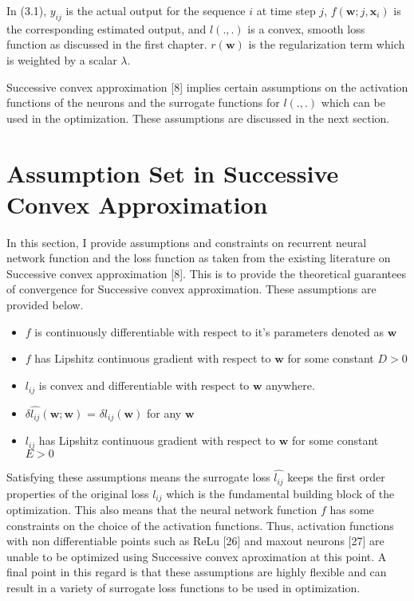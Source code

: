 In (3.1), $y_{ij}$ is the actual output for the sequence $i$ at time step $j$, 
$f(\textbf{w};j,\textbf{x}_i)$ is the corresponding estimated output, and $l(.,.)$ is a convex, smooth loss function as discussed in the first chapter. $r(\textbf{w})$ is the regularization term which is weighted by a scalar $\lambda$.

Successive convex approximation [8] implies certain assumptions on the activation functions of the neurons and the surrogate functions for $l(.,.)$ which can be used in the optimization. These assumptions are discussed in the next section.
\newpage

\section {Assumption Set in Successive Convex Approximation}

In this section, I provide assumptions and constraints on recurrent neural network function and the loss function as taken from the existing literature on Successive convex approximation [8]. This is to provide the theoretical guarantees of convergence for Successive convex approximation. These assumptions are provided below.   
 
\begin{itemize}
	\item $f$ is continuously differentiable with respect to it's parameters denoted as $\textbf{w}$
	\item $f$ has Lipshitz continuous gradient with respect to $\textbf{w}$ for some constant $D>0$
	\item $\hat{l_{ij}}$ is convex and differentiable with respect to $\textbf{w}$ anywhere. 
	\item $\delta \hat{l_{ij}}(\textbf{w};\textbf{w})$ = $\delta l_{ij}(\textbf{w})$ for any $\textbf{w}$
	\item $\hat{l_{ij}}$ has Lipshitz continuous gradient with respect to $\textbf{w}$ for some constant $E>0$
\end{itemize}

Satisfying these assumptions means the surrogate loss $\hat{l_{ij}}$ keeps the first order properties of the original loss $l_{ij}$ which is the fundamental building block of the optimization. This also means that the neural network function $f$ has some constraints on the choice of the activation functions. Thus, activation functions with non differentiable points such as ReLu [26] and maxout neurons [27] are unable to be optimized using Successive convex aproximation at this point. A final point in this regard is that these assumptions are highly flexible and can result in a variety of surrogate loss functions to be used in optimization. 


